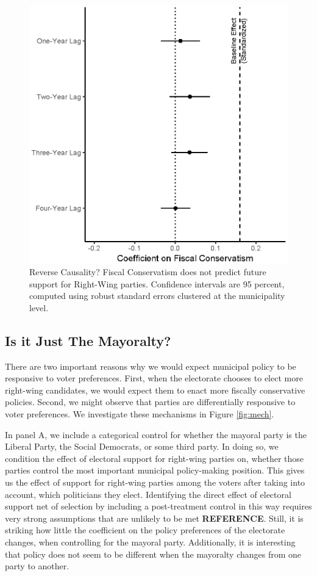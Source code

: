 \documentclass[a4paper,12pt]{article}
\begin{document}
\begin{figure}[!htb]
	\centering
	\includegraphics[scale = 1]{granger_18092018.eps}
	\caption{Reverse Causality? Fiscal Conservatism does not predict future support for Right-Wing parties. Confidence intervals are 95 percent, computed using robust standard errors clustered at the municipality level.} \label{fig:granger}
\end{figure}
\clearpage
\subsection{Is it Just The Mayoralty?}\label{mechanism}

There are two important reasons why we would expect municipal policy to be responsive to voter preferences. First, when the electorate chooses to elect more right-wing candidates, we would expect them to enact more fiscally conservative policies. Second, we might observe that parties are differentially responsive to voter preferences. We investigate these mechanisms in Figure \ref{fig:mech}.

In panel A, we include a categorical control for whether the mayoral party is the Liberal Party, the Social Democrats, or some third party.  In doing so, we condition the effect of electoral support for right-wing parties on, whether those parties control the most important municipal policy-making position. This gives us the effect of support for right-wing parties among the voters after taking into account, which politicians they elect. Identifying the direct effect of electoral support net of selection by including a post-treatment control in this way requires very strong assumptions that are unlikely to be met \textbf{REFERENCE}. Still, it is striking how little the coefficient on the policy preferences of the electorate changes, when controlling for the mayoral party. Additionally, it is interesting that policy does not seem to be different when the mayoralty changes from one party to another.
\end{document}
